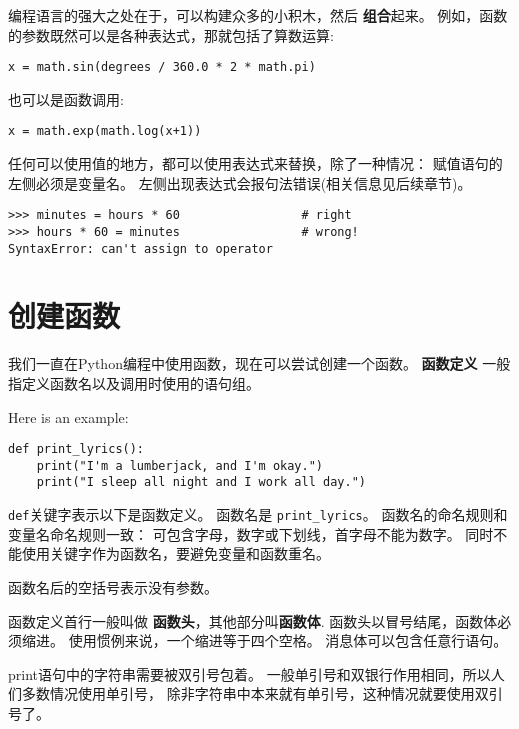 \documentclass[10pt]{book}
\begin{document}
编程语言的强大之处在于，可以构建众多的小积木，然后 {\bf 组合}起来。
例如，函数的参数既然可以是各种表达式，那就包括了算数运算:

\begin{verbatim}
x = math.sin(degrees / 360.0 * 2 * math.pi)
\end{verbatim}
%
也可以是函数调用:

\begin{verbatim}
x = math.exp(math.log(x+1))
\end{verbatim}
%
任何可以使用值的地方，都可以使用表达式来替换，除了一种情况：
赋值语句的左侧必须是变量名。
左侧出现表达式会报句法错误(相关信息见后续章节)。

\begin{verbatim}
>>> minutes = hours * 60                 # right
>>> hours * 60 = minutes                 # wrong!
SyntaxError: can't assign to operator
\end{verbatim}
%


\section{创建函数}

我们一直在Python编程中使用函数，现在可以尝试创建一个函数。
{\bf 函数定义} 一般指定义函数名以及调用时使用的语句组。

Here is an example:

\begin{verbatim}
def print_lyrics():
    print("I'm a lumberjack, and I'm okay.")
    print("I sleep all night and I work all day.")
\end{verbatim}
%

{\tt def}关键字表示以下是函数定义。
函数名是 \verb"print_lyrics"。
函数名的命名规则和变量名命名规则一致：
可包含字母，数字或下划线，首字母不能为数字。
同时不能使用关键字作为函数名，要避免变量和函数重名。

函数名后的空括号表示没有参数。

函数定义首行一般叫做 {\bf 函数头}，其他部分叫{\bf 函数体}.
函数头以冒号结尾，函数体必须缩进。
使用惯例来说，一个缩进等于四个空格。
消息体可以包含任意行语句。

print语句中的字符串需要被双引号包着。
一般单引号和双银行作用相同，所以人们多数情况使用单引号，
除非字符串中本来就有单引号，这种情况就要使用双引号了。
\end{document}

